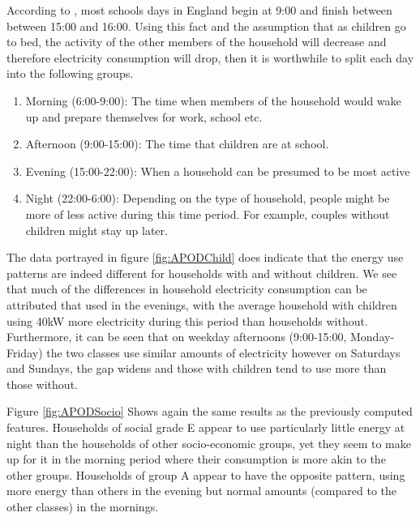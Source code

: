 According to \cite{school times}, most schools days in England begin at 9:00 and finish between between 15:00 and 16:00. Using this fact and the assumption that as children go to bed, the activity of the other members of the household will decrease and therefore electricity consumption will drop, then it is worthwhile to split each day into the following groups.
\begin{enumerate}
\item Morning (6:00-9:00): The time when members of the household would wake up and prepare themselves for work, school etc.
\item Afternoon (9:00-15:00): The time that children are at school.
\item Evening (15:00-22:00):  When a household can be presumed to be most active
\item Night (22:00-6:00): Depending on the type of household, people might be more of less active during this time period. For example, couples without children might stay up later.
\end{enumerate}
\APODChild


The data portrayed in figure \ref{fig:APODChild} does indicate that the energy use patterns are indeed different for households with and without children. We see that much of the differences in household electricity consumption can be attributed that used in the evenings, with the average household with children using 40kW more electricity during this period than households without. Furthermore, it can be seen that on weekday afternoons (9:00-15:00, Monday-Friday) the two classes use similar amounts of electricity however on Saturdays and Sundays, the gap widens and those with children tend to use more than those without. 

\APODSocio

Figure \ref{fig:APODSocio} Shows again the same results as the previously computed features. Households of social grade E appear to use particularly little energy at night than the households of other socio-economic groups, yet they seem to make up for it in the morning period where their consumption is more akin to the other groups. Households of group A appear to have the opposite pattern, using more energy than others in the evening but normal amounts (compared to the other classes) in the mornings.


